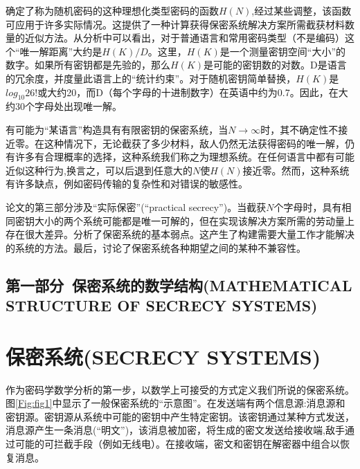 \documentclass[]{article}
\begin{document}
确定了称为随机密码的这种理想化类型密码的函数$H(N)$,经过某些调整，该函数可应用于许多实际情况。这提供了一种计算获得保密系统解决方案所需截获材料数量的近似方法。从分析中可以看出，对于普通语言和常用密码类型（不是编码）这个“唯一解距离”大约是$H(K)/D$。这里，$H(K)$是一个测量密钥空间“大小”的数字。如果所有密钥都是先验的，那么$H(K)$是可能的密钥数的对数。D是语言的冗余度，并度量此语言上的“统计约束”。对于随机密钥简单替换，$H(K)$是$log_{10}26!$或大约20，而D（每个字母的十进制数字）在英语中约为0.7。因此，在大约30个字母处出现唯一解。


有可能为“某语言”构造具有有限密钥的保密系统，当$N\rightarrow \infty$时，其不确定性不接近零。在这种情况下，无论截获了多少材料，敌人仍然无法获得密码的唯一解，仍有许多有合理概率的选择，这种系统我们称之为理想系统。在任何语言中都有可能近似这种行为,换言之，可以后退到任意大的$N$使$H(N)$接近零。然而，这种系统有许多缺点，例如密码传输的复杂性和对错误的敏感性。

论文的第三部分涉及“实际保密”(“practical secrecy”)。当截获$N$个字母时，具有相同密钥大小的两个系统可能都是唯一可解的，但在实现该解决方案所需的劳动量上存在很大差异。分析了保密系统的基本弱点。这产生了构建需要大量工作才能解决的系统的方法。最后，讨论了保密系统各种期望之间的某种不兼容性。

\newpage

\begin{center}
	\section*{第一部分\ 保密系统的数学结构(MATHEMATICAL STRUCTURE OF SECRECY SYSTEMS)}
\end{center}

%   
%

\section{保密系统(SECRECY SYSTEMS)}

作为密码学数学分析的第一步，以数学上可接受的方式定义我们所说的保密系统。图\ref{Fig:fig1}中显示了一般保密系统的“示意图”。在发送端有两个信息源:消息源和密钥源。密钥源从系统中可能的密钥中产生特定密钥。该密钥通过某种方式发送，消息源产生一条消息(“明文”)，该消息被加密，将生成的密文发送给接收端,敌手通过可能的可拦截手段（例如无线电）。在接收端，密文和密钥在解密器中组合以恢复消息。
\par
\end{document}
